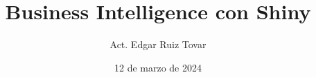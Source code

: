 \documentclass{beamer}
\title{Business Intelligence con Shiny}
\author{Act. Edgar Ruiz Tovar}
\institute{Actuarios por México}
\date{12 de marzo de 2024}
\begin{document}
    \begin{frame}
      \titlepage
    \end{frame}
    
    
    
    
    
    
    
    
    
    
    
    
    
\end{document}
